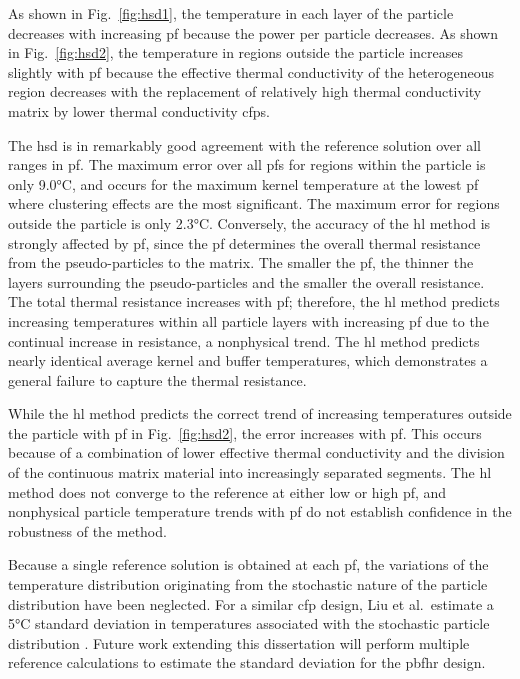As shown in Fig.\ \ref{fig:hsd1}, the temperature in each layer of the particle decreases with increasing \gls{pf} because the power per particle decreases. As shown in Fig.\ \ref{fig:hsd2}, the temperature in regions outside the particle increases slightly with \gls{pf} because the effective thermal conductivity of the heterogeneous region decreases with the replacement of relatively high thermal conductivity matrix by lower thermal conductivity \glspl{cfp}.

The \gls{hsd} is in remarkably good agreement with the reference solution over all ranges in \gls{pf}. The maximum error over all \glspl{pf} for regions within the particle is only 9.0\si{\celsius}, and occurs for the maximum kernel temperature at the lowest \gls{pf} where clustering effects are the most significant. The maximum error for regions outside the particle is only 2.3\si{\celsius}. Conversely, the accuracy of the \gls{hl} method is strongly affected by \gls{pf}, since the \gls{pf} determines the overall thermal resistance from the pseudo-particles to the matrix. The smaller the \gls{pf}, the thinner the layers surrounding the pseudo-particles and the smaller the overall resistance. The total thermal resistance increases with \gls{pf}; therefore, the \gls{hl} method predicts increasing temperatures within all particle layers with increasing \gls{pf} due to the continual increase in resistance, a nonphysical trend. The \gls{hl} method predicts nearly identical average kernel and buffer temperatures, which demonstrates a general failure to capture the thermal resistance.

While the \gls{hl} method predicts the correct trend of increasing temperatures outside the particle with \gls{pf} in Fig.\ \ref{fig:hsd2}, the error increases with \gls{pf}. This occurs because of a combination of lower effective thermal conductivity and the division of the continuous matrix material into increasingly separated segments. The \gls{hl} method does not converge to the reference at either low or high \gls{pf}, and nonphysical particle temperature trends with \gls{pf} do not establish confidence in the robustness of the method. 

Because a single reference solution is obtained at each \gls{pf}, the variations of the temperature distribution originating from the stochastic nature of the particle distribution have been neglected. For a similar \gls{cfp} design, Liu et al.\ estimate a 5\si{\celsius} standard deviation in temperatures associated with the stochastic particle distribution \cite{liu}. Future work extending this dissertation will perform multiple reference calculations to estimate the standard deviation for the \gls{pbfhr} design.

